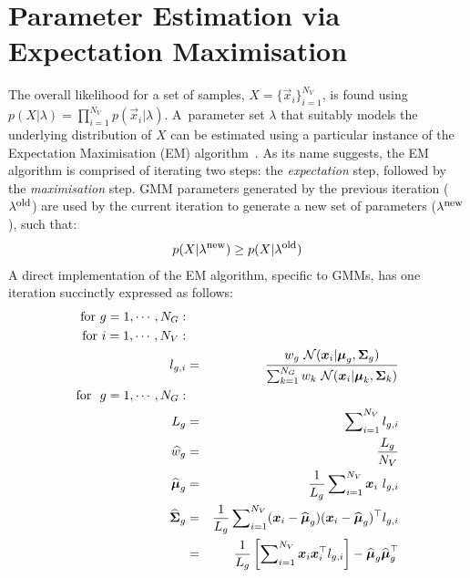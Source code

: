 \section{Parameter Estimation via Expectation Maximisation}
\label{sec:parameter_estimation}

\noindent
The overall likelihood for a set of samples, $X=\{\Vec{x}_i\}_{i=1}^{N_V}$,
is found using $p(X | \lambda) = \prod\nolimits_{i=1}^{N_V} p(\Vec{x}_i | \lambda)$.
A~parameter set $\lambda$ that suitably models the underlying distribution of $X$ can be estimated using a particular instance of the Expectation Maximisation (EM) algorithm~\cite{Dempster77, McLachlan-2008, Moon96, Redner84}.
As its name suggests, the EM algorithm is comprised of iterating two steps: the {\it expectation} step, followed by the {\it maximisation} step.
GMM parameters generated by the previous iteration ($\lambda^{\mbox{\footnotesize old}}$) are used
by the current iteration to generate a new set of parameters ($\lambda^{\mbox{\footnotesize new}}$), such that:
%
\begin{eqnarray}
	p(X|\lambda^{\mbox{\footnotesize new}}) \geq p(X|\lambda^{\mbox{\footnotesize old}})
\end{eqnarray}
%
A direct implementation of the EM algorithm, specific to GMMs, has one iteration succinctly expressed as follows:
%
\begin{eqnarray}
  \mbox{for} ~g=1, \cdots, N_G: \nonumber \\
  \mbox{for} ~i=1, \cdots, N_V: \nonumber \\
  l_{g,i} & = & \frac{w_g ~ {{\mathcal{N}}}( {\boldsymbol{x}}_i | {\boldsymbol{\mu}}_g, {\boldsymbol{\Sigma}}_g )}
  {\sum\nolimits_{k=1}^{N_G} w_k ~ {{\mathcal{N}}}( {\boldsymbol{x}}_i | {\boldsymbol{\mu}}_k, {\boldsymbol{\Sigma}}_k )} \label{eqn:aposteriori}\\
\mbox{for} ~~ g  =  1, \cdots, N_G:  \nonumber \\
	L_g & = & \sum\nolimits_{i=1}^{N_V} l_{g,i} \label{eqn:L_k} \\
	\widehat{w}_g & = & \frac{L_g}{N_V} \label{eqn:m_k} \\
	\widehat{{\boldsymbol{\mu}}}_g & = & \frac{1}{L_g} \sum\nolimits_{i=1}^{N_V} {\boldsymbol{x}}_i ~ l_{g,i}  \label{eqn:em_mean} \\
	\widehat{{\boldsymbol{\Sigma}}}_g & = & \frac{1}{L_g} \sum\nolimits_{i=1}^{N_V} ({\boldsymbol{x}}_i - \widehat{{\boldsymbol{\mu}}}_g)({\boldsymbol{x}}_i - \widehat{{\boldsymbol{\mu}}}_g)^\top l_{g,i} \label{eqn:em_covA} \\
	& = &  \frac{1}{L_g} \left[ \sum\nolimits_{i=1}^{N_V} {\boldsymbol{x}}_i {\boldsymbol{x}}_i^\top l_{g,i} \right] - \widehat{{\boldsymbol{\mu}}}_g \widehat{{\boldsymbol{\mu}}}_g^\top \label{eqn:em_covB}
\end{eqnarray}

